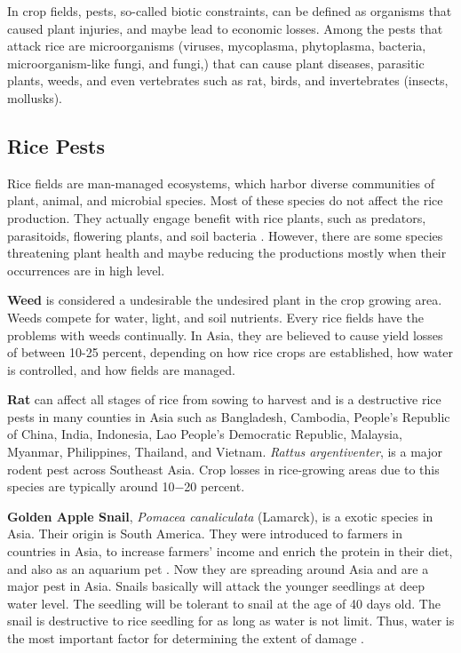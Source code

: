 In crop fields, pests, so-called biotic constraints, can be defined as organisms that caused plant injuries, and maybe lead to economic losses. Among the pests that attack rice are microorganisms (viruses, mycoplasma, phytoplasma, bacteria, microorganism-like fungi, and fungi,) that can cause plant diseases, parasitic plants, weeds, and even vertebrates such as rat, birds, and invertebrates (insects, mollusks).
\newpage

\subsection*{Rice Pests}

Rice fields are man-managed ecosystems, which harbor diverse communities of plant, animal, and microbial species. Most of these species do not affect the rice production. They actually engage benefit with rice plants, such as predators, parasitoids, flowering plants, and soil bacteria \citep{norton2010rice}. However, there are some species threatening plant health and maybe reducing the productions mostly when their occurrences are in high level.

\textbf{Weed} is considered a undesirable the undesired plant in the crop growing area. Weeds compete for water, light, and soil nutrients. Every rice fields have the problems with weeds continually. In Asia, they are believed to cause yield losses of between 10-25 percent, depending on how rice crops are established, how water is controlled, and how fields are managed.

\textbf{Rat} can affect all stages of rice from sowing to harvest and is a destructive rice pests in many counties in Asia such as Bangladesh, Cambodia, People’s Republic of China, India, Indonesia, Lao People’s Democratic Republic, Malaysia, Myanmar, Philippines, Thailand, and Vietnam. \textit{Rattus argentiventer}, is a major rodent pest across Southeast Asia.  Crop losses in rice-growing areas due to this species are typically around 10−20 percent. 

\textbf{Golden Apple Snail}, \textit{Pomacea canaliculata} (Lamarck), is a exotic species in Asia. Their origin is South America. They were introduced to farmers in countries in Asia, to increase farmers' income and enrich the protein in their diet, and also as an aquarium pet \citep{joshi2007problems}. Now they are spreading around Asia and are a major pest in Asia. Snails basically will attack the younger seedlings at deep water level. The seedling will be tolerant to snail at the age of 40 days old. The snail is destructive to rice seedling for as long as water is not limit. Thus, water is the most important factor for determining the extent of damage \citep{sin2003damage}.


